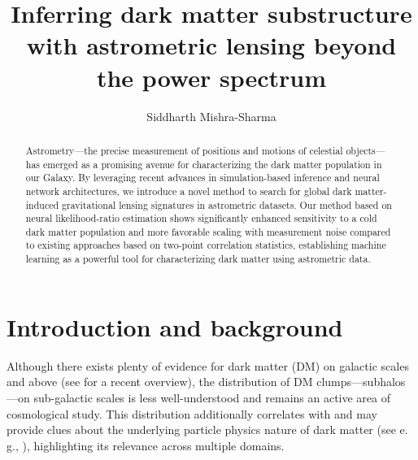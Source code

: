 \documentclass[twocolumn,linenumbers,anonymous]{aastex631}
\newcommand{\eg}{{e.\,g.}\xspace}
\begin{document}
\sloppy\sloppypar\raggedbottom\frenchspacing

\title{Inferring dark matter substructure with astrometric lensing beyond the power spectrum}

\author[0000-0001-9088-7845]{Siddharth Mishra-Sharma}

\begin{abstract}\noindent
Astrometry---the precise measurement of positions and motions of celestial objects---has emerged as a promising avenue for characterizing the dark matter population in our Galaxy. By leveraging recent advances in simulation-based inference and neural network architectures, we introduce a novel method to search for global dark matter-induced gravitational lensing signatures in astrometric datasets. Our method based on neural likelihood-ratio estimation shows significantly enhanced sensitivity to a cold dark matter population and more favorable scaling with measurement noise compared to existing approaches based on two-point correlation statistics, establishing machine learning as a powerful tool for characterizing dark matter using astrometric data. 
\end{abstract}


\section{Introduction and background}
\label{sec:intro}

Although there exists plenty of evidence for dark matter (DM) on galactic scales and above (see \citet{Green:2021jrr} for a recent overview), the distribution of DM clumps---subhalos---on sub-galactic scales is less well-understood and remains an active area of cosmological study. This distribution additionally correlates with and may provide clues about the underlying particle physics nature of dark matter (see \eg, \citet{Schutz:2020jox,Bode:2000gq,Dalcanton:2000hn}), highlighting its relevance across multiple domains.
\end{document}
